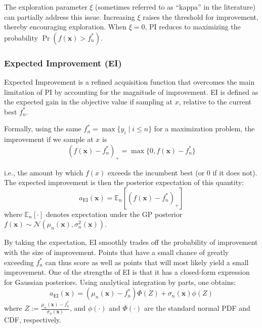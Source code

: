 \documentclass{ut-thesis}
\begin{document}
The exploration parameter $\xi$ (sometimes referred to as ``kappa'' in the literature) can partially address this issue. Increasing $\xi$ raises the threshold for improvement, thereby encouraging exploration. When $\xi = 0$, PI reduces to maximizing the probability $\Pr(f(\mathbf{x}) > f_n^*)$.

\subsubsection{Expected Improvement (EI)}
Expected Improvement is a refined acquisition function that overcomes the main limitation of PI by accounting for the magnitude of improvement. EI is defined as the expected gain in the objective value if sampling at $x$, relative to the current best $f^*_n$\cite{mockus1975bayesian}\cite{mockus1989bayesian}. 

Formally, using the same $f^*_n = \max\{y_i \mid i \le n\}$ for a maximization problem, the improvement if we sample at $x$ is 
\begin{equation}
    (f(\mathbf{x}) - f^*_n)_+ = \max\{0, f(\mathbf{x}) - f^*_n\}
\end{equation}

i.e., the amount by which $f(x)$ exceeds the incumbent best (or 0 if it does not). The expected improvement is then the posterior expectation of this quantity:
\begin{equation}
    a_{\mathrm{EI}}(\mathbf{x}) = \mathbb{E}_n\left[(f(\mathbf{x}) - f^*_n)_+\right]
\end{equation}
where $\mathbb{E}_n[\cdot]$ denotes expectation under the GP posterior $f(\mathbf{x}) \sim \mathcal{N}(\mu_n(\mathbf{x}), \sigma_n^2(\mathbf{x}))$. 

By taking the expectation, EI smoothly trades off the probability of improvement with the size of improvement. Points that have a small chance of greatly exceeding $f^*_n$ can thus score as well as points that will most likely yield a small improvement. One of the strengths of EI is that it has a closed-form expression for Gaussian posteriors. Using analytical integration by parts, one obtains:
\begin{equation}
    a_{\mathrm{EI}}(\mathbf{x}) = (\mu_n(\mathbf{x}) - f^*_n)\Phi(Z) + \sigma_n(\mathbf{x})\phi(Z)
\end{equation}
where $Z := \frac{\mu_n(\mathbf{\mathbf{x}}) - f^*_n}{\sigma_n(\mathbf{\mathbf{x}})}$, and $\phi(\cdot)$ and $\Phi(\cdot)$ are the standard normal PDF and CDF, respectively.
\end{document}
